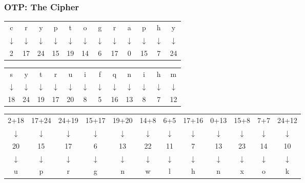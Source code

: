 \documentclass[12pt]{beamer}
\begin{document}
\begin{frame}
\frametitle{OTP: The Cipher}

\begin{center}
\begin{tabular}{cccccccccccc}
c & r & y & p & t & o & g & r & a & p & h & y \\
$\downarrow$ & $\downarrow$ & $\downarrow$ & $\downarrow$ & $\downarrow$ & $\downarrow$ & $\downarrow$ & $\downarrow$ & $\downarrow$ & $\downarrow$ & $\downarrow$ & $\downarrow$  \\
2 & 17 & 24 & 15 & 19 & 14 & 6 & 17 & 0 & 15 & 7 & 24 \\
\end{tabular}
\end{center}

\begin{center}
\begin{tabular}{cccccccccccc}
s & y & t & r & u & i & f & q & n & i & h & m \\
$\downarrow$ & $\downarrow$ & $\downarrow$ & $\downarrow$ & $\downarrow$ & $\downarrow$ & $\downarrow$ & $\downarrow$ & $\downarrow$ & $\downarrow$ & $\downarrow$ & $\downarrow$  \\
18 & 24 & 19 & 17 & 20 & 8 & 5 & 16 & 13 & 8 & 7 & 12 \\
\end{tabular}
\end{center}

\begin{center}
\begin{tabular}{cccccccccccc}
2+18 & 17+24 & 24+19 & 15+17 & 19+20 & 14+8 & 6+5 & 17+16 & 0+13 & 15+8 & 7+7 & 24+12 \\
$\downarrow$ & $\downarrow$ & $\downarrow$ & $\downarrow$ & $\downarrow$ & $\downarrow$ & $\downarrow$ & $\downarrow$ & $\downarrow$ & $\downarrow$ & $\downarrow$ & $\downarrow$  \\
20 & 15 & 17 & 6 & 13 & 22 & 11 & 7 & 13 & 23 & 14 & 10 \\
$\downarrow$ & $\downarrow$ & $\downarrow$ & $\downarrow$ & $\downarrow$ & $\downarrow$ & $\downarrow$ & $\downarrow$ & $\downarrow$ & $\downarrow$ & $\downarrow$ & $\downarrow$  \\
u & p & r & g & n & w & l & h & n & x & o & k
\end{tabular}
\end{center}
\end{frame}
\end{document}
